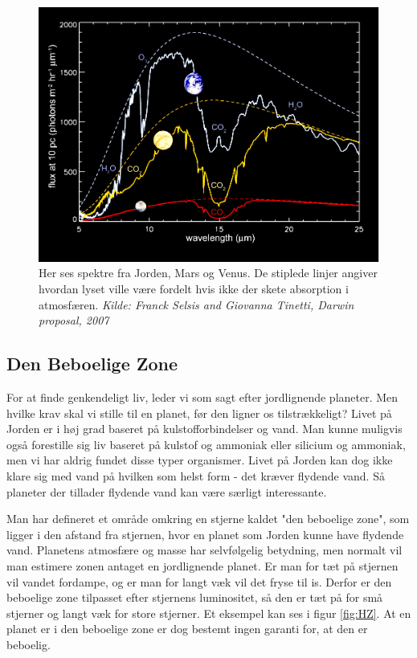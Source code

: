 \begin{figure}[h!]
    \centering
    \includegraphics[width=.6\textwidth]{Astrofysik/billeder/venus-earth-mars_ir.jpg}
    \caption{Her ses spektre fra Jorden, Mars og Venus. De stiplede linjer angiver hvordan lyset ville være fordelt hvis ikke der skete absorption i atmosfæren.  \textit{Kilde: Franck Selsis and Giovanna Tinetti, Darwin proposal, 2007}} %
    \label{fig:Biospektrer}
\end{figure}

\subsection*{Den Beboelige Zone}
For at finde genkendeligt liv, leder vi som sagt efter jordlignende planeter. Men hvilke krav skal vi stille til en planet, før den ligner os tilstrækkeligt?
Livet på Jorden er i høj grad baseret på kulstofforbindelser og vand. Man kunne muligvis også forestille sig liv baseret på kulstof og ammoniak eller silicium og ammoniak, men vi har aldrig fundet disse typer organismer. Livet på Jorden kan dog ikke klare sig med vand på hvilken som helst form - det kræver flydende vand. Så planeter der tillader flydende vand kan være særligt interessante.

Man har defineret et område omkring en stjerne kaldet "den beboelige zone", som ligger i den afstand fra stjernen, hvor en planet som Jorden kunne have flydende vand. Planetens atmosfære og masse har selvfølgelig betydning, men normalt vil man estimere zonen antaget en jordlignende planet. Er man for tæt på stjernen vil vandet fordampe, og er man for langt væk vil det fryse til is. Derfor er den beboelige zone tilpasset efter stjernens luminositet, så den er tæt på for små stjerner og langt væk for store stjerner. Et eksempel kan ses i figur \ref{fig:HZ}. At en planet er i den beboelige zone er dog bestemt ingen garanti for, at den er beboelig.

